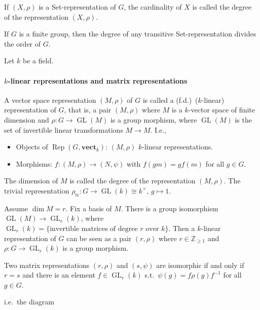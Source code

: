 \documentclass[11pt, a4paper]{report}
\begin{document}
\begin{definition}
If $(X, \rho)$ is a Set-representation of $G$, the cardinality of $X$ is called the degree of the representation $(X, \rho)$.
\end{definition}

\begin{corollary}
If $G$ is a finite group, then the degree of any transitive Set-representation divides the order of $G$.
\end{corollary}

Let $k$ be a field.

\paragraph{$k$-linear representations and matrix representations}

\begin{definition}
A vector space representation $(M, \rho)$ of $G$ is called a (f.d.)\ ($k$-linear) representation of $G$, that is, a pair $(M, \rho)$ where $M$ is a $k$-vector space of finite dimension and $\rho: G \rightarrow \operatorname{GL}(M)$ is a group morphism, where $\operatorname{GL}(M)$ is the set of invertible linear transformations $M \rightarrow M$. I.e.,
\begin{itemize}
\item Objects of $\operatorname{Rep}(G, \mathbf{vect}_k)$: $(M, \rho)$ $k$-linear representations.
\item Morphisms: $f: (M, \rho) \rightarrow (N, \psi)$ with $f(gm)=gf(m)$ for all $g \in G$.
\end{itemize}
The dimension of $M$ is called the degree of the representation $(M, \rho)$. The trivial representation $\rho_{\mathrm{tr}}: G \rightarrow \operatorname{GL}(k) \cong k^\times$, $g \mapsto 1$.
\end{definition}

\begin{definition}
Assume $\dim M = r$. Fix a basis of $M$. There is a group isomorphism $\operatorname{GL}(M) \rightarrow \operatorname{GL}_r(k)$, where $\operatorname{GL}_r(k) = \{\text{invertible matrices of degree } r \text{ over } k\}$. Then a $k$-linear representation of $G$ can be seen as a pair $(r, \rho)$ where $r \in \mathbb{Z}_{\geqslant 1}$ and $\rho: G \rightarrow \operatorname{GL}_r(k)$ is a group morphism.
\end{definition}

\begin{remark}
Two matrix representations $(r, \rho)$ and $(s, \psi)$ are isomorphic if and only if $r=s$ and there is an element $f \in \operatorname{GL}_r(k)$ s.t.\ $\psi(g)=f \rho(g) f^{-1}$ for all $g \in G$.
\end{remark}
i.e.\ the diagram
\end{document}
